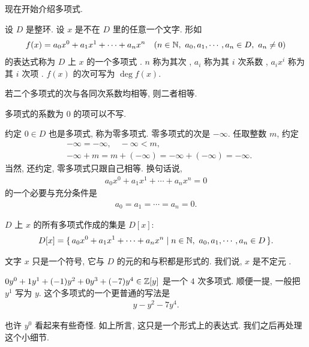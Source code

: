 \subsection*{\DefinitionOfPolynomials}
\markright{\DefinitionOfPolynomials}

现在开始介绍多项式.

\begin{definition}
    设 $D$ 是整环. 设 $x$ 是不在 $D$ 里的任意一个文字. 形如
    \begin{align*}
        f(x) = a_0 x^0 + a_1 x^1 + \cdots + a_n x^n \quad (n \in \NN,\ a_0,a_1,\cdots,a_n \in D,\ a_n \neq 0)
    \end{align*}
    的表达式称为 $D$ 上 $x$ 的一个多项式 . $n$ 称为其次 , $a_i$ 称为其 $i$ 次系数 , $a_i x^i$ 称为其 $i$ 次项 . $f(x)$ 的次可写为 $\deg f(x)$.

    若二个多项式的次与各同次系数均相等, 则二者相等.

    多项式的系数为 $0$ 的项可以不写.

    约定 $0 \in D$ 也是多项式, 称为零多项式. 零多项式的次是 $-\infty$. 任取整数 $m$, 约定
    \begin{align*}
         & -\infty = -\infty, \quad -\infty < m,                        \\
         & -\infty + m = m + (-\infty) = -\infty + (-\infty) = -\infty.
    \end{align*}
    当然, 还约定, 零多项式只跟自己相等. 换句话说,
    \begin{align*}
        a_0 x^0 + a_1 x^1 + \cdots + a_n x^n = 0
    \end{align*}
    的一个必要与充分条件是
    \begin{align*}
        a_0 = a_1 = \cdots = a_n = 0.
    \end{align*}

    $D$ 上 $x$ 的所有多项式作成的集是 $D[x]$:
    \begin{align*}
        D[x] = \{\, a_0 x^0 + a_1 x^1 + \cdots + a_n x^n \mid n \in \mathbb{N},\ a_0,a_1,\cdots,a_n \in D \,\}.
    \end{align*}

    文字 $x$ 只是一个符号, 它与 $D$ 的元的和与积都是形式的. 我们说, $x$ 是不定元 .
\end{definition}

\begin{example}
    $0y^0 + 1y^1 + (-1)y^2 + 0y^3 + (-7)y^4 \in \mathbb{Z}[y]$ 是一个 $4$ 次多项式. 顺便一提, 一般把 $y^1$ 写为 $y$. 这个多项式的一个更普通的写法是
    \begin{align*}
        y - y^2 - 7y^4.
    \end{align*}

    也许 $y^0$ 看起来有些奇怪. 如上所言, 这只是一个形式上的表达式. 我们之后再处理这个小细节.
\end{example}

